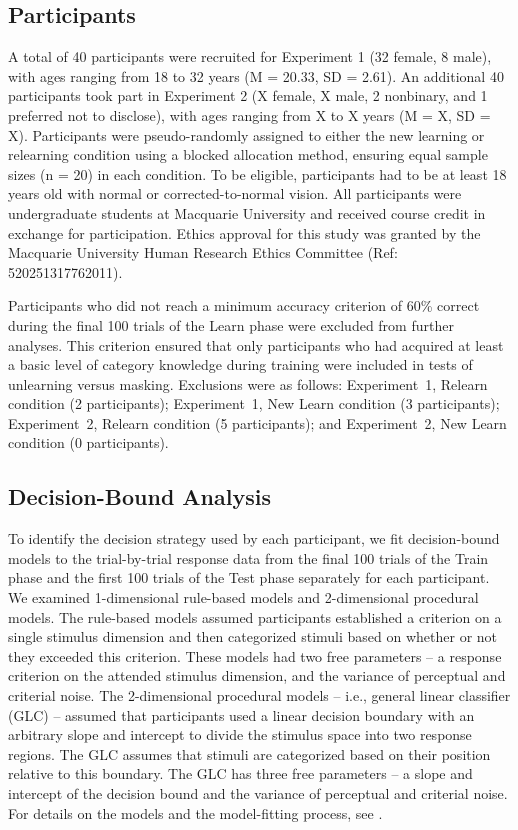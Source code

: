 \documentclass{article}
\begin{document}
\subsection{Participants}
A total of 40 participants were recruited for Experiment 1
(32 female, 8 male), with ages ranging from 18 to 32 years
(M = 20.33, SD = 2.61). An additional 40 participants took
part in Experiment 2 (X female, X male, 2 nonbinary, and 1
preferred not to disclose), with ages ranging from X to X
years (M = X, SD = X). Participants were pseudo-randomly
assigned to either the new learning or relearning condition
using a blocked allocation method, ensuring equal sample
sizes (n = 20) in each condition. To be eligible,
participants had to be at least 18 years old with normal or
corrected-to-normal vision. All participants were
undergraduate students at Macquarie University and received
course credit in exchange for participation. Ethics approval
for this study was granted by the Macquarie University Human
Research Ethics Committee (Ref: 520251317762011).

Participants who did not reach a minimum accuracy criterion
of 60\% correct during the final 100 trials of the Learn
phase were excluded from further analyses. This criterion
ensured that only participants who had acquired at least a
basic level of category knowledge during training were
included in tests of unlearning versus masking. Exclusions
were as follows: Experiment~1, Relearn condition (2
participants); Experiment~1, New Learn condition (3
participants); Experiment~2, Relearn condition (5
participants); and Experiment~2, New Learn condition (0
participants).

\subsection{Decision-Bound Analysis}
To identify the decision strategy used by each participant,
we fit decision-bound models \cite{AshbyValentin2018}
to the trial-by-trial response data from the final 100
trials of the Train phase and the first 100 trials of the
Test phase separately for each participant. We examined
1-dimensional rule-based models and 2-dimensional procedural
models.  The rule-based models assumed participants
established a criterion on a single stimulus dimension and
then categorized stimuli based on whether or not they
exceeded this criterion. These models had two free
parameters -- a response criterion on the attended stimulus
dimension, and the variance of perceptual and criterial
noise. The 2-dimensional procedural models -- i.e., general
linear classifier (GLC) --  assumed that participants used a
linear decision boundary with an arbitrary slope and
intercept to divide the stimulus space into two response
regions. The GLC assumes that stimuli are categorized based
on their position relative to this boundary. The GLC has
three free parameters -- a slope and intercept of the
decision bound and the variance of perceptual and criterial
noise. For details on the models and the model-fitting
process, see \cite{AshbyValentin2018}.
\end{document}
